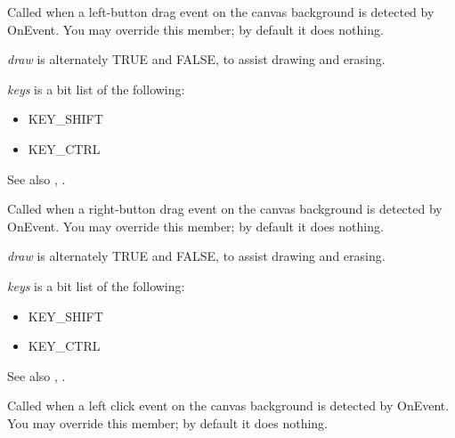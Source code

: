 \label{wxshapecanvasondragleft}


Called when a left-button drag event on the canvas background is detected by OnEvent. You may override this member;
by default it does nothing.

{\it draw} is alternately TRUE and FALSE, to assist drawing and erasing.

{\it keys} is a bit list of the following:

\begin{itemize}\itemsep=0pt
\item KEY\_SHIFT
\item KEY\_CTRL
\end{itemize}

See also , .

\label{wxshapecanvasondragright}


Called when a right-button drag event on the canvas background is detected by OnEvent. You may override this member;
by default it does nothing.

{\it draw} is alternately TRUE and FALSE, to assist drawing and erasing.

{\it keys} is a bit list of the following:

\begin{itemize}\itemsep=0pt
\item KEY\_SHIFT
\item KEY\_CTRL
\end{itemize}

See also , .

\label{wxshapecanvasonleftclick}


Called when a left click event on the canvas background is detected by OnEvent. You may override this member;
by default it does nothing.

